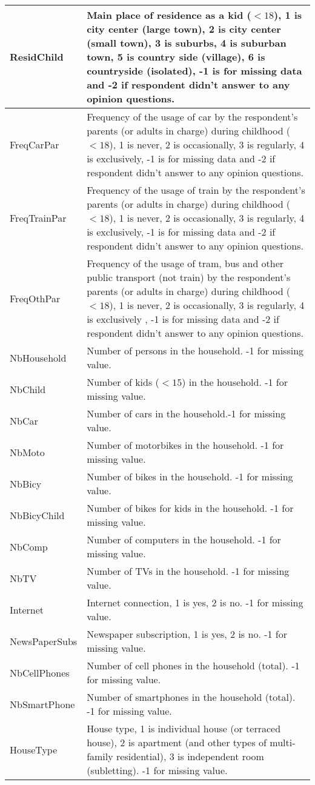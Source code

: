 \documentclass[12pt,a4paper]{article}
\begin{document}
\begin{longtable}{||p{4cm}|p{9cm}||}
\hline 
ResidChild & Main place of residence as a kid ($<18$), 1 is city center (large town), 2 is city center (small town), 3 is suburbs, 4 is suburban town, 5 is country side (village), 6 is countryside (isolated), -1 is for missing data and -2 if respondent didn't answer to any opinion questions. \tabularnewline
\hline 
FreqCarPar & Frequency of the usage of car by the respondent's parents (or adults in charge) during childhood ($<18$), 1 is never, 2 is occasionally, 3 is regularly, 4 is exclusively, -1 is for missing data and -2 if respondent didn't answer to any opinion questions. \tabularnewline
\hline 
FreqTrainPar & Frequency of the usage of train by the respondent's parents (or adults in charge) during childhood ($<18$), 1 is never, 2 is occasionally, 3 is regularly, 4 is exclusively, -1 is for missing data and -2 if respondent didn't answer to any opinion questions. \tabularnewline 
\hline 
FreqOthPar & Frequency of the usage of tram, bus and other public transport (not train) by the respondent's parents (or adults in charge) during childhood ($<18$), 1 is never, 2 is occasionally, 3 is regularly, 4 is exclusively , -1 is for missing data and -2 if respondent didn't answer to any opinion questions. \tabularnewline
\hline
NbHousehold & Number of persons in the household. -1 for missing value. \tabularnewline
\hline 
NbChild & Number of kids ($<15$) in the household. -1 for missing value. \tabularnewline
\hline 
NbCar & Number of cars in the household.-1 for missing value. \tabularnewline
\hline 
NbMoto & Number of motorbikes in the household. -1 for missing value.\tabularnewline
\hline 
NbBicy & Number of bikes in the household. -1 for missing value.\tabularnewline
\hline 
NbBicyChild & Number of bikes for kids in the household. -1 for missing value.\tabularnewline
\hline 
NbComp & Number of computers in the household. -1 for missing value.\tabularnewline
\hline 
NbTV & Number of TVs in the household. -1 for missing value.\tabularnewline
\hline 
Internet & Internet connection, 1 is yes, 2 is no. -1 for missing value.\tabularnewline
\hline 
NewsPaperSubs & Newspaper subscription, 1 is yes, 2 is no. -1 for missing value.\tabularnewline
\hline 
NbCellPhones & Number of cell phones in the household (total). -1 for missing value.\tabularnewline
\hline 
NbSmartPhone & Number of smartphones in the household (total). -1 for missing value.\tabularnewline
\hline 
HouseType & House type, 1 is individual house (or terraced house), 2 is apartment (and other types of multi-family residential), 3 is independent room (subletting). -1 for missing value.\tabularnewline

\end{longtable}
\end{document}
